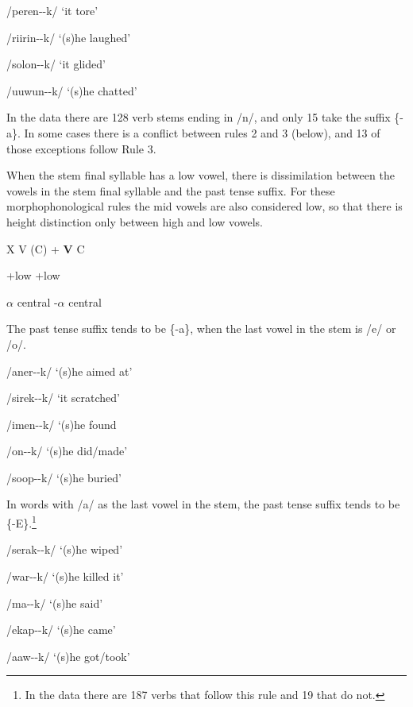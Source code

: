 /peren--k/  `it tore'

/riirin--k/  `(s)he laughed'

/solon--k/  `it glided'

/uuwun--k/  `(s)he chatted'

In the data there are 128 verb stems ending in /n/, and only 15 take the suffix \{\nobreakdash-a\}. In some cases there is a conflict between rules 2 and 3 (below), and 13 of those exceptions follow Rule 3.

 When the stem final syllable has a low vowel, there is dissimilation between the vowels in the stem final syllable and the past tense suffix. For these morphophonological rules the mid vowels are also considered low, so that there is height distinction only between high and low vowels.

\textsc{X  V  (C)}      + \textsc{ \textbf{V}  C}

    +low    +low

    $\alpha $ central    -$\alpha $ central

The past tense suffix tends to be \{-a\}, when the last vowel in the stem is /e/ or /o/. 

/aner--k/  `(s)he aimed at'

/sirek--k/  `it scratched'

/imen--k/  `(s)he found

/on--k/  `(s)he did/made'

/soop--k/  `(s)he buried'

In words with /a/ as the last vowel in the stem, the past tense suffix tends to be \{\nobreakdash-E\}.\footnote{In the data there are 187 verbs that follow this rule and 19 that do not.}


/serak--k/  `(s)he wiped'

/war--k/  `(s)he killed it'

/ma--k/  `(s)he said'

/ekap--k/  `(s)he came'

/aaw--k/  `(s)he got/took'

